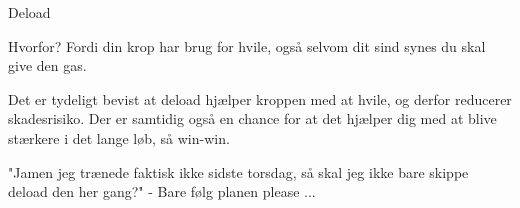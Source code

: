 \begin{multicols}{2}
\begin{tList}{Deload}
  \item Hvorfor?
    Fordi din krop har brug for hvile, også selvom dit sind synes
    du skal give den gas.

  \item Det er tydeligt bevist at deload hjælper kroppen med at
    hvile, og derfor reducerer skadesrisiko. Der er samtidig også en
    chance for at det hjælper dig med at blive stærkere i det lange
    løb, så win-win.

  \item "Jamen jeg trænede faktisk ikke sidste torsdag, så skal jeg
    ikke bare skippe deload den her gang?"
    - Bare følg planen please ...
  \end{tList}


\end{multicols}
